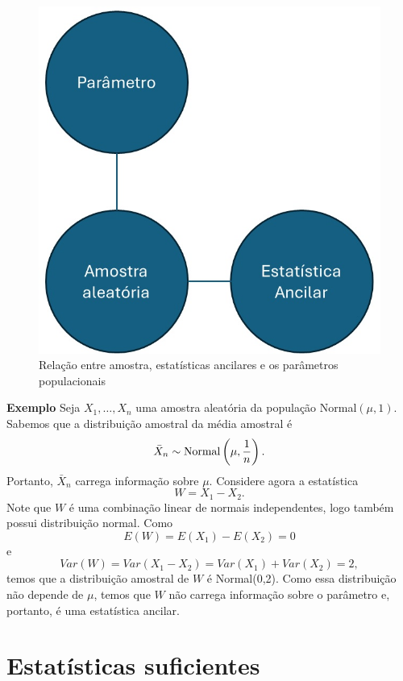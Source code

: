 \documentclass[
  letterpaper,
  DIV=11,
  numbers=noendperiod]{scrreprt}
\begin{document}
\begin{figure}

{\centering \includegraphics{fig_stat_ancilar.jpg}

}

\caption{Relação entre amostra, estatísticas ancilares e os parâmetros
populacionais}

\end{figure}%

\textbf{Exemplo} Seja \(X_1,\ldots,X_{n}\) uma amostra aleatória da
população Normal\((\mu,1)\). Sabemos que a distribuição amostral da
média amostral é
\[\bar{X}_n\sim\hbox{Normal}\left(\mu,\frac{1}{n}\right).\] Portanto,
\(\bar{X}_n\) carrega informação sobre \(\mu\). Considere agora a
estatística \[W=X_1-X_2.\] Note que \(W\) é uma combinação linear de
normais independentes, logo também possui distribuição normal. Como
\[E(W)=E(X_1)-E(X_2)=0\] e \[Var(W)=Var(X_1-X_2)=Var(X_1)+Var(X_2)=2,\]
temos que a distribuição amostral de \(W\) é Normal(0,2). Como essa
distribuição não depende de \(\mu\), temos que \(W\) não carrega
informação sobre o parâmetro e, portanto, é uma estatística ancilar.

\section{Estatísticas suficientes}\label{estatuxedsticas-suficientes}
\end{document}
